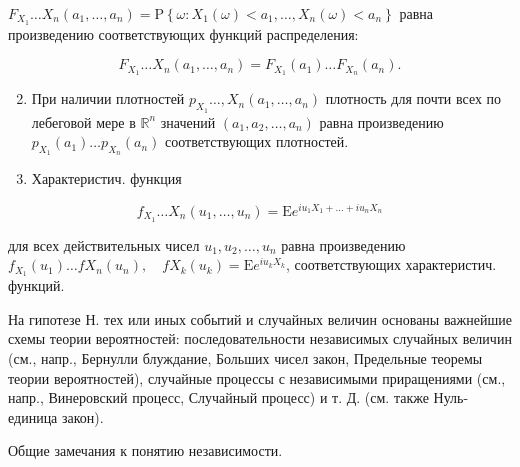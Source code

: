 \documentclass[10pt]{article}
\begin{document}
$F_{X_{1}} \ldots X_{n}\left(a_{1}, \ldots, a_{n}\right)=\mathrm{P}\left\{\omega: X_{1}(\omega)<a_{1}, \ldots, X_{n}(\omega)<a_{n}\right\}$ равна произведению соответствующих функций распределения:



\[

F_{X_{1}} \ldots X_{n}\left(a_{1}, \ldots, a_{n}\right)=F_{X_{1}}\left(a_{1}\right) \ldots F_{X_{n}}\left(a_{n}\right) .

\]



\begin{enumerate}

  \setcounter{enumi}{1}

  \item При наличии плотностей $p_{X_{1}} \ldots, X_{n}\left(a_{1}, \ldots, a_{n}\right)$ плотность для почти всех по лебеговой мере в $\mathbb{R}^{n}$ значений $\left(a_{1}, a_{2}, \ldots, a_{n}\right)$ равна произведению $p_{X_{1}}\left(a_{1}\right) \ldots p_{X_{n}}\left(a_{n}\right)$ соответствующих плотностей.



  \item Характеристич. функция



\end{enumerate}



\[

f_{X_{1}} \ldots X_{n}\left(u_{1}, \ldots, u_{n}\right)=\mathrm{E} e^{i u_{1} X_{1}+\ldots+i u_{n} X_{n}}

\]



для всех действительных чисел $u_{1}, u_{2}, \ldots, u_{n}$ равна произведению $f_{X_{1}}\left(u_{1}\right) \ldots f X_{n}\left(u_{n}\right), \quad f X_{k}\left(u_{k}\right)=\mathrm{E} e^{i u_{k} X_{k}}$, соответствующих характеристич. функций.



На гипотезе Н. тех или иных событий и случайных величин основаны важнейшие схемы теории вероятностей: последовательности независимых случайных величин (см., напр., Бернулли блуждание, Больших чисел закон, Предельные теоремы теории вероятностей), случайные процессы с независимыми приращениями (см., напр., Винеровский процесс, Случайный процесс) и т. Д. (см. также Нуль-единица закон).



Общие замечания к понятию независимости.
\end{document}
